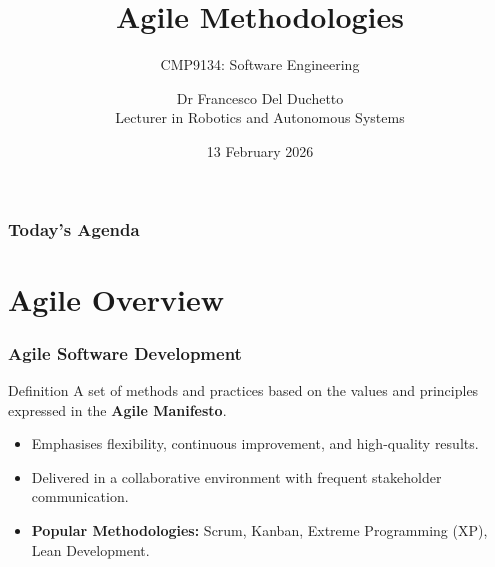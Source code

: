 \documentclass[xcolor=table]{beamer}
\title[CMP9134 - Week 2]{Agile Methodologies}
\subtitle{CMP9134: Software Engineering}
\author[Francesco Del Duchetto]{Dr Francesco Del Duchetto\\Lecturer in Robotics and Autonomous Systems}
\institute[University of Lincoln]{University of Lincoln}
\date{13 February 2026}
\begin{document}
\begin{frame}
    \titlepage
\end{frame}

\begin{frame}
    \frametitle{Today's Agenda}
    \tableofcontents
\end{frame}

\section{Agile Overview}

\begin{frame}
    \frametitle{Agile Software Development}
    \begin{block}{Definition}
        A set of methods and practices based on the values and principles expressed in the \textbf{Agile Manifesto}.
    \end{block}
    \vspace{0.5cm}
    \begin{itemize}
        \item Emphasises flexibility, continuous improvement, and high-quality results.
        \item Delivered in a collaborative environment with frequent stakeholder communication.
        \item \textbf{Popular Methodologies:} Scrum, Kanban, Extreme Programming (XP), Lean Development.
    \end{itemize}
\end{frame}
\end{document}
